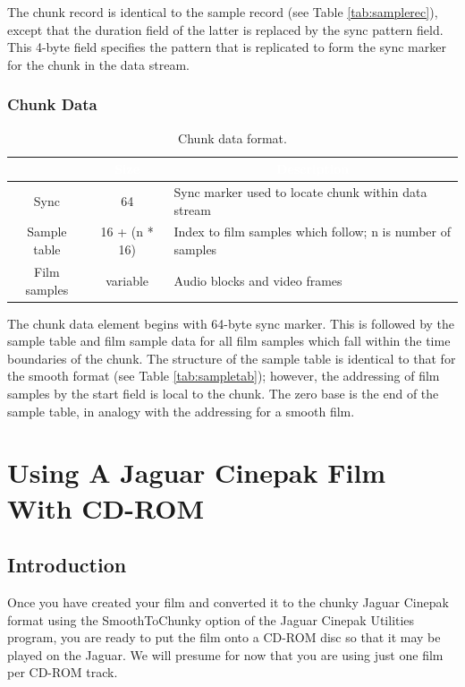 \documentclass[12pt,letterpaper,twoside]{article}
\newcommand{\tabheadtxt}[1]{\multicolumn{1}{c}{\textcolor{white}{\textbf{#1}}}}
\begin{document}
The chunk record is identical to the sample record (see Table \ref{tab:samplerec}), except that the duration field of the latter is replaced by the sync pattern field. This 4-byte field specifies the pattern that is replicated to form the sync marker for the chunk in the data stream. 

\subsubsection{Chunk Data}

\begin{table}[h]
\centering
\begin{tabular}{|c|c|p{10cm}|}
\hline
\rowcolor{black}
\tabheadtxt{Field} & \tabheadtxt{Size} & \tabheadtxt{Description} \\
\hline
Sync & 64 & Sync marker used to locate chunk within data stream\\
\hline
Sample table & 16 + (n * 16) & Index to film samples which follow; n is number of samples\\
\hline
Film samples & variable & Audio blocks and video frames\\
\hline
\end{tabular}
\caption{Chunk data format.}
\label{tab:chunkdata}
\end{table}
\FloatBarrier

The chunk data element begins with 64-byte sync marker. This is followed by the sample table and film sample data for all film samples which fall within the time boundaries of the chunk. The structure of the sample table is identical to that for the smooth format (see Table \ref{tab:sampletab}); however, the addressing of film samples by the start field is local to the chunk. The zero base is the end of the sample table, in analogy with the addressing for a smooth film. 

\section{Using A Jaguar Cinepak Film With CD-ROM}

\subsection{Introduction}
Once you have created your film and converted it to the chunky Jaguar Cinepak format using the SmoothToChunky option of the Jaguar Cinepak Utilities program, you are ready to put the film onto a CD-ROM disc so that it may be played on the Jaguar. We will presume for now that you are using just one film per CD-ROM track. 
\end{document}
